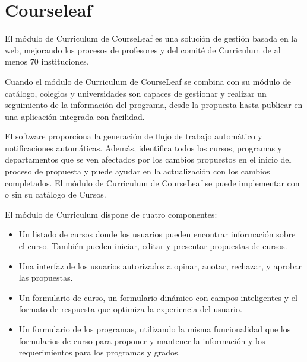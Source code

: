 \section{Courseleaf}
El módulo de Curriculum de CourseLeaf es una solución de gestión basada en la web, mejorando los procesos de profesores y del comité de Curriculum de al menos 70 instituciones\citep{courseleaf_webpage}.

Cuando el módulo de Curriculum de CourseLeaf se combina con su módulo de catálogo, colegios y universidades son capaces de gestionar y realizar un seguimiento de la información del programa, desde la propuesta hasta publicar en una aplicación integrada con facilidad.

El software proporciona la generación de flujo de trabajo automático y notificaciones automáticas. Además, identifica todos los cursos, programas y departamentos que se ven afectados por los cambios propuestos en el inicio del proceso de propuesta y puede ayudar en la actualización con los cambios completados. El módulo de Curriculum de CourseLeaf se puede implementar con o sin su catálogo de Cursos.

El módulo de Curriculum dispone de cuatro componentes:
\begin{itemize}
	\item Un listado de cursos donde los usuarios pueden encontrar información sobre el curso. También pueden iniciar, editar y presentar propuestas de cursos.
	\item Una interfaz de los usuarios autorizados a opinar, anotar, rechazar, y aprobar las propuestas.
	\item Un formulario de curso, un formulario dinámico con campos inteligentes y el formato de respuesta que optimiza la experiencia del usuario.
	\item Un formulario de los programas, utilizando la misma funcionalidad que los formularios de curso para proponer y mantener la información y los requerimientos para los programas y grados.
\end{itemize}